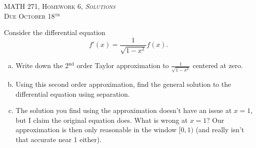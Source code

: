 \documentclass[12pt]{article} %
\begin{document}
\begin{center}
   \textsc{\large MATH 271, Homework 6, \emph{Solutions}}\\
   \textsc{Due October 18$^\textrm{th}$}
\end{center}
\vspace{.5cm}

\begin{problem}
Consider the differential equation
\[
f'(x) = \frac{1}{\sqrt{1-x^2}} f(x).
\]
\begin{enumerate}[(a)]
    \item Write down the 2$^\textrm{nd}$ order Taylor approximation to $\frac{1}{\sqrt{1-x^2}}$ centered at zero.
    \item Using this second order approximation, find the general solution to the differential equation using separation.
    \item The solution you find using the approximation doesn't have an issue at $x=1$, but I claim the original equation does.  What is wrong at $x=1$? Our approximation is then only reasonable in the window $[0,1)$ (and really isn't that accurate near 1 either).
\end{enumerate}
\end{problem}
\end{document}
